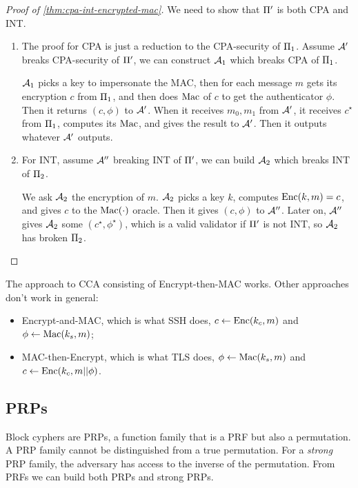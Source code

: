 \begin{proof}[Proof of \cref{thm:cpa-int-encrypted-mac}]
	We need to show that $\CCAScheme$ is both \ac{CPA} and \ac{INT}.
	\begin{enumerate}
		\item The proof for \ac{CPA} is just a reduction to the \ac{CPA}-security of $\SKEScheme[1]$.
			Assume $\Adv'$ breaks \ac{CPA}-security of $\CCAScheme$, we can construct $\Adv_1$ which breaks \ac{CPA} of $\SKEScheme[1]$.

			$\Adv_1$ picks a key to impersonate the \ac{MAC}, then for each message $m$ gets its encryption $c$ from $\SKEScheme[1]$, and then does $\GenericMac$ of $c$ to get the authenticator $\phi$.
			Then it returns $(c, \phi)$ to $\Adv'$.
			When it receives $m_0, m_1$ from $\Adv'$, it receives $c^{\star}$ from $\SKEScheme[1]$, computes its $\GenericMac$, and gives the result to $\Adv'$.
			Then it outputs whatever $\Adv'$ outputs.
		\item For \ac{INT}, assume $\Adv''$ breaking \ac{INT} of $\CCAScheme$, we can build $\Adv_2$ which breaks \ac{INT} of $\GenericMACScheme[2]$.

			We ask $\Adv_2$ the encryption of $m$.
			$\Adv_2$ picks a key $k$, computes $\SKEEnc(k, m) = c$, and gives $c$ to the $\GenericMac(\cdot)$ oracle.
			Then it gives $(c, \phi)$ to $\Adv''$.
			Later on, $\Adv''$ gives $\Adv_2$ some $(c^{\star}, \phi^{\star})$, which is a valid validator if $\CCAScheme$ is not \ac{INT}, so $\Adv_2$ has broken $\GenericMACScheme[2]$. \qedhere
	\end{enumerate}
\end{proof}

The approach to \ac{CCA} consisting of Encrypt-then-\ac{MAC} works.
Other approaches don't work in general:
\begin{itemize}
	\item Encrypt-and-\ac{MAC}, which is what \ac{SSH} does, \ie $c \from \SKEEnc(k_c, m)$ and $\phi \from \GenericMac(k_s, m)$;
	\item \ac{MAC}-then-Encrypt, which is what \ac{TLS} does, \ie $\phi \from \GenericMac(k_s, m)$ and $c \from \SKEEnc(k_c, m || \phi)$.
\end{itemize}

\subsection{\aclp{PRP}}

Block cyphers are \acp{PRP}, a function family that is a \ac{PRF} but also a permutation.
A \ac{PRP} family cannot be distinguished from a true permutation.
For a \emph{strong} \ac{PRP} family, the adversary has access to the inverse of the permutation.
From \acp{PRF} we can build both \acp{PRP} and strong \acp{PRP}.

